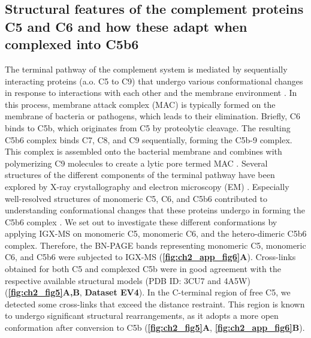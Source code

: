 \subsection*{Structural features of the complement proteins C5 and C6 and how these adapt when complexed into C5b6}
The terminal pathway of the complement system is mediated by sequentially interacting proteins (a.o. C5 to C9) that undergo various conformational changes in response to interactions with each other and the membrane environment \cite{Bajic_2015, Bayly-Jones_2017, Hadders_2012, Schatz-Jakobsen_2016}. In this process, membrane attack complex (MAC) is typically formed on the membrane of bacteria or pathogens, which leads to their elimination. Briefly, C6 binds to C5b, which originates from C5 by proteolytic cleavage. The resulting C5b6 complex binds C7, C8, and C9 sequentially, forming the C5b-9 complex. This complex is assembled onto the bacterial membrane and combines with polymerizing C9 molecules to create a lytic pore termed MAC \cite{Esser_1994}. Several structures of the different components of the terminal pathway have been explored by X-ray crystallography and electron microscopy (EM) \cite{Aleshin_2012, DiScipio_1988, DiScipio_1989, Fredslund_2008, Hadders_2012, Lovelace_2011, Menny_2018}. Especially well-resolved structures of monomeric C5, C6, and C5b6 contributed to understanding conformational changes that these proteins undergo in forming the C5b6 complex \cite{Aleshin_2012, Fredslund_2008, Hadders_2012}. We set out to investigate these different conformations by applying IGX-MS on monomeric C5, monomeric C6, and the hetero-dimeric C5b6 complex. Therefore, the BN-PAGE bands representing monomeric C5, monomeric C6, and C5b6 were subjected to IGX-MS (\textbf{\autoref{fig:ch2_app_fig6}A}). Cross-links obtained for both C5 and complexed C5b were in good agreement with the respective available structural models (PDB ID: 3CU7 and 4A5W) (\textbf{\autoref{fig:ch2_fig5}A,B}, \textbf{Dataset EV4}). In the C-terminal region of free C5, we detected some cross-links that exceed the distance restraint. This region is known to undergo significant structural rearrangements, as it adopts a more open conformation after conversion to C5b (\textbf{\autoref{fig:ch2_fig5}A}, \textbf{\autoref{fig:ch2_app_fig6}B}).

